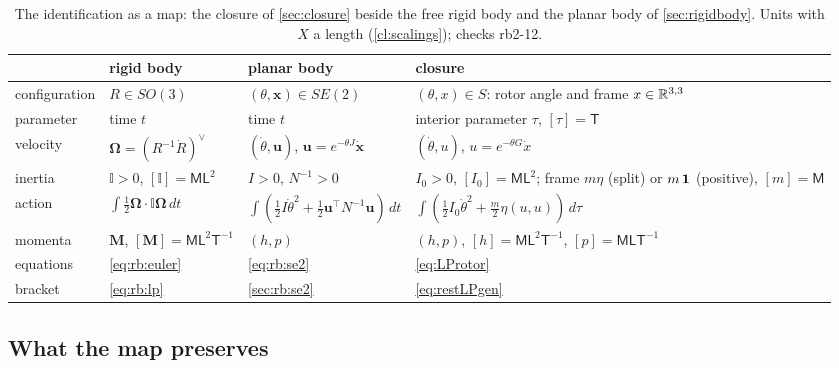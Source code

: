 \begin{table}[t]
\centering\small
\begin{tabular}{@{}>{\raggedright\arraybackslash}p{2.5cm}>{\raggedright\arraybackslash}p{3.3cm}>{\raggedright\arraybackslash}p{3.5cm}>{\raggedright\arraybackslash}p{4.7cm}@{}}
\toprule
 & rigid body & planar body & closure\\
\midrule
configuration & $R\in SO(3)$ & $(\theta,\mathbf x)\in SE(2)$ & $(\theta,x)\in S$: rotor angle and frame $x\in\mathbb{R}^{3,3}$\\
parameter & time $t$ & time $t$ & interior parameter $\tau$, $[\tau]=\mathsf T$\\
velocity & $\boldsymbol\Omega=(R^{-1}\dot R)^\vee$ & $(\dot\theta,\mathbf u)$, $\mathbf u=e^{-\theta J}\dot{\mathbf x}$ & $(\dot\theta,u)$, $u=e^{-\theta G}\dot x$\\
inertia & $\mathbb I>0$, $[\mathbb I]=\mathsf{ML}^2$ & $I>0$, $N^{-1}>0$ & $I_0>0$, $[I_0]=\mathsf{ML}^2$; frame $m\eta$ (split) or $m\,\mathbf 1$ (positive), $[m]=\mathsf M$\\
action & $\int\tfrac12\boldsymbol\Omega\cdot\mathbb I\boldsymbol\Omega\,dt$ & $\int(\tfrac12I\dot\theta^2+\tfrac12\mathbf u^{\!\top}N^{-1}\mathbf u)\,dt$ & $\int(\tfrac12I_0\dot\theta^2+\tfrac m2\eta(u,u))\,d\tau$\\
momenta & $\mathbf M$, $[\mathbf M]=\mathsf{ML}^2\mathsf T^{-1}$ & $(h,p)$ & $(h,p)$, $[h]=\mathsf{ML}^2\mathsf T^{-1}$, $[p]=\mathsf{MLT}^{-1}$\\
equations & \eqref{eq:rb:euler} & \eqref{eq:rb:se2} & \eqref{eq:LProtor}\\
bracket & \eqref{eq:rb:lp} & \cref{sec:rb:se2} & \eqref{eq:restLPgen}\\
\bottomrule
\end{tabular}
\caption{The identification as a map: the closure of \cref{sec:closure} beside the free rigid body and the planar body of \cref{sec:rigidbody}.
Units with $X$ a length (\cref{cl:scalings}); checks rb2-12.}
\label{tab:esmap}
\end{table}

\subsection{What the map preserves}
\label{sec:esmap:preserve}


